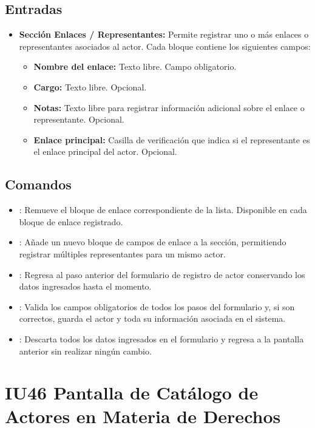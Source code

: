 \subsection{Entradas}
\begin{itemize}
	\item \textbf{Sección Enlaces / Representantes:} Permite registrar uno o 
	más enlaces o representantes asociados al actor. Cada bloque contiene los 
	siguientes campos:
	\begin{itemize}
		\item \textbf{Nombre del enlace:} Texto libre. Campo obligatorio.
		\item \textbf{Cargo:} Texto libre. Opcional.
		\item \textbf{Notas:} Texto libre para registrar información adicional 
		sobre el enlace o representante. Opcional.
		\item \textbf{Enlace principal:} Casilla de verificación que indica si 
		el representante es el enlace principal del actor. Opcional.
	\end{itemize}
\end{itemize}

\subsection{Comandos}
\begin{itemize}
	\item {}: Remueve el bloque de enlace correspondiente de 
	la lista. Disponible en cada bloque de enlace registrado.
	\item {}: Añade un nuevo bloque de campos de enlace 
	a la sección, permitiendo registrar múltiples representantes para un mismo 
	actor.
	\item {}: Regresa al paso anterior del formulario de 
	registro de actor conservando los datos ingresados hasta el momento.
	\item {}: Valida los campos obligatorios de todos 
	los pasos del formulario y, si son correctos, guarda el actor y toda su 
	información asociada en el sistema.
	\item {}: Descarta todos los datos ingresados en el 
	formulario y regresa a la pantalla anterior sin realizar ningún cambio.
\end{itemize}


\section{IU46 Pantalla de Catálogo de Actores en Materia de Derechos}
